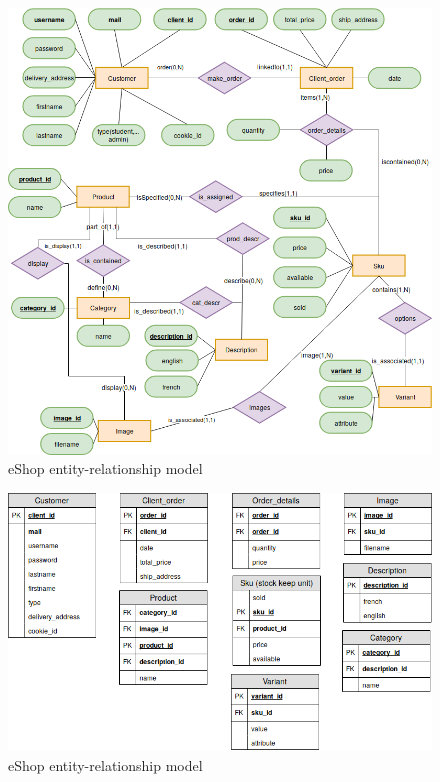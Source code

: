 \documentclass{article}
\begin{document}
\begin{figure}[h!]
    \centering
    \includegraphics[scale=0.4]{./images/ecommerce_ER.png}
    \caption{eShop entity-relationship model}
    \label{ecommerce_ER}
\end{figure}

\begin{figure}[h!]
    \centering
    \includegraphics[scale=0.4]{./images/ecommerce_SQL.png}
    \caption{eShop entity-relationship model}
    \label{ecommerce_SQL}
\end{figure}
\end{document}
